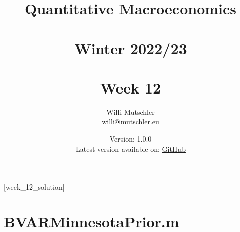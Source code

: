 
\newif\ifDisplaySolutions%


\title{Quantitative Macroeconomics\\~\\Winter 2022/23\\~\\Week 12}
\author{Willi Mutschler\\willi@mutschler.eu}
\date{Version: 1.0.0\\Latest version available on: \href{https://github.com/wmutschl/Quantitative-Macroeconomics/releases/latest/download/week_12.pdf}{GitHub}}
\maketitle\thispagestyle{empty}

\newpage
{}[week_12_solution]
\tableofcontents\thispagestyle{empty}\newpage

\setcounter{page}{1}
\newpage
\newpage
\printbibliography
\newpage
\appendix
\section{BVARMinnesotaPrior.m}


\ifDisplaySolutions
\newpage

\section{Solutions}

\fi
